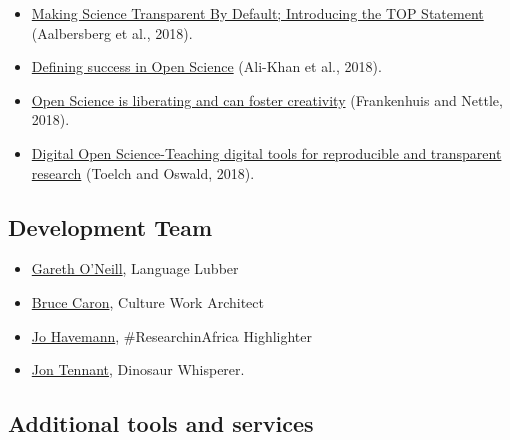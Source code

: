 \documentclass[]{book}
\providecommand{\tightlist}{%
  \setlength{\itemsep}{0pt}\setlength{\parskip}{0pt}}
\begin{document}
\begin{itemize}
\item
  \href{https://github.com/OpenScienceMOOC/Module-1-Open-Principles/blob/master/Reading\%20Material_Open\%20Principles/Aalbersberg\%20et\%20al.\%2C\%202018.pdf}{Making Science Transparent By Default; Introducing the TOP Statement} (Aalbersberg et al., 2018).
\item
  \href{https://github.com/OpenScienceMOOC/Module-1-Open-Principles/blob/master/Reading\%20Material_Open\%20Principles/Ali-Khan\%20et\%20al.\%2C\%202018.pdf}{Defining success in Open Science} (Ali-Khan et al., 2018).
\item
  \href{https://github.com/OpenScienceMOOC/Module-1-Open-Principles/blob/master/Reading\%20Material_Open\%20Principles/Frankenhuis\%20and\%20Nettle\%2C\%202018.pdf}{Open Science is liberating and can foster creativity} (Frankenhuis and Nettle, 2018).
\item
  \href{https://github.com/OpenScienceMOOC/Module-1-Open-Principles/blob/master/Reading\%20Material_Open\%20Principles/Toelch\%20and\%20Oswald\%2C\%202018.pdf}{Digital Open Science-Teaching digital tools for reproducible and transparent research} (Toelch and Oswald, 2018).
\end{itemize}

\hypertarget{development-team}{%
\subsection{Development Team }\label{development-team}}

\begin{itemize}
\tightlist
\item
  \href{https://twitter.com/gtoneill}{Gareth O'Neill}, Language Lubber
\item
  \href{https://twitter.com/junanaguy}{Bruce Caron}, Culture Work Architect
\item
  \href{https://twitter.com/johave}{Jo Havemann}, \#ResearchinAfrica Highlighter
\item
  \href{https://twitter.com/protohedgehog}{Jon Tennant}, Dinosaur Whisperer.
\end{itemize}

\hypertarget{additional-tools-and-services}{%
\subsection{Additional tools and services}\label{additional-tools-and-services}}
\end{document}
